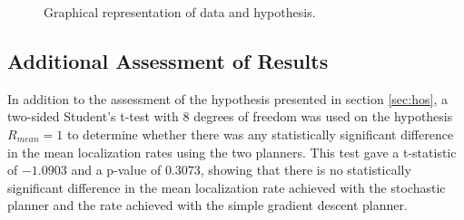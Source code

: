 \documentclass[submit, 12pt]{aiaa-pretty-modified}
\begin{document}
\begin{figure}
\begin{center}
\caption{Graphical representation of data and hypothesis.}
\label{fig:killer}
\end{center}
\end{figure}


\subsection{Additional Assessment of Results}
\label{sec:additional}
In addition to the assessment of the hypothesis presented in section \ref{sec:hos}, a two-sided Student's
t-test with 8 degrees of freedom was used on the hypothesis $R_{mean}
= 1$ to determine whether there was any statistically significant
difference in the mean localization rates using the two planners.  This test gave
a t-statistic of $-1.0903$ and a p-value of $0.3073$, showing that
there is no statistically significant difference in the mean localization
rate achieved with the stochastic planner and the rate achieved with
the simple gradient descent planner.
\end{document}
